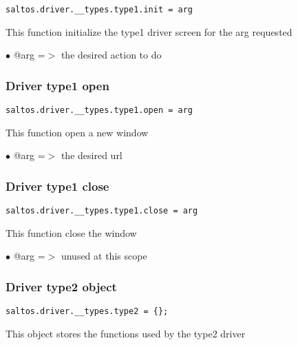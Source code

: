\documentclass[a4paper]{article}
\begin{document}
\begin{lstlisting}
saltos.driver.__types.type1.init = arg
\end{lstlisting}

This function initialize the type1 driver screen for the arg requested

\begin{compactitem}
\item[\color{myblue}$\bullet$] @arg =$>$ the desired action to do
\end{compactitem}

\hypertarget{toc742}{}
\subsubsection{Driver type1 open}

\begin{lstlisting}
saltos.driver.__types.type1.open = arg
\end{lstlisting}

This function open a new window

\begin{compactitem}
\item[\color{myblue}$\bullet$] @arg =$>$ the desired url
\end{compactitem}

\hypertarget{toc743}{}
\subsubsection{Driver type1 close}

\begin{lstlisting}
saltos.driver.__types.type1.close = arg
\end{lstlisting}

This function close the window

\begin{compactitem}
\item[\color{myblue}$\bullet$] @arg =$>$ unused at this scope
\end{compactitem}

\hypertarget{toc744}{}
\subsubsection{Driver type2 object}

\begin{lstlisting}
saltos.driver.__types.type2 = {};
\end{lstlisting}

This object stores the functions used by the type2 driver
\end{document}

